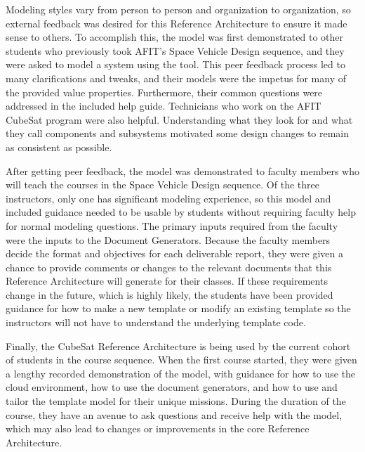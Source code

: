 Modeling styles vary from person to person and organization to organization, so external feedback was desired for this Reference Architecture to ensure it made sense to others. To accomplish this, the model was first demonstrated to other students who previously took AFIT's Space Vehicle Design sequence, and they were asked to model a system using the tool. This peer feedback process led to many clarifications and tweaks, and their models were the impetus for many of the provided value properties. Furthermore, their common questions were addressed in the included help guide. Technicians who work on the AFIT CubeSat program were also helpful. Understanding what they look for and what they call components and subsystems motivated some design changes to remain as consistent as possible.

After getting peer feedback, the model was demonstrated to faculty members who will teach the courses in the Space Vehicle Design sequence. Of the three instructors, only one has significant modeling experience, so this model and included guidance needed to be usable by students without requiring faculty help for normal modeling questions. The primary inputs required from the faculty were the inputs to the Document Generators. Because the faculty members decide the format and objectives for each deliverable report, they were given a chance to provide comments or changes to the relevant documents that this Reference Architecture will generate for their classes. If these requirements change in the future, which is highly likely, the students have been provided guidance for how to make a new template or modify an existing template so the instructors will not have to understand the underlying template code.

Finally, the CubeSat Reference Architecture is being used by the current cohort of students in the course sequence. When the first course started, they were given a lengthy recorded demonstration of the model, with guidance for how to use the cloud environment, how to use the document generators, and how to use and tailor the template model for their unique missions. During the duration of the course, they have an avenue to ask questions and receive help with the model, which may also lead to changes or improvements in the core Reference Architecture. 